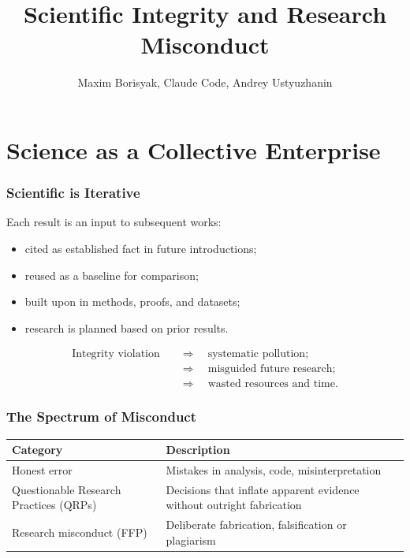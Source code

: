 \documentclass[]{beamer}
\author{Maxim Borisyak, Claude Code, Andrey Ustyuzhanin}
\institute{Constructor University Bremen}
\begin{document}
\title{Scientific Integrity and Research Misconduct}

\begin{frame}[plain]
\titlepage
\end{frame}

\section{Science as a Collective Enterprise}

\begin{frame}[fragile]
\frametitle{Scientific is Iterative}
Each result is an input to subsequent works:
\begin{itemize}
  \item cited as established fact in future introductions;
  \item reused as a baseline for comparison;
  \item built upon in methods, proofs, and datasets;
  \item research is planned based on prior results.
\end{itemize}

\begin{align*}
\text{Integrity violation}\quad &\Longrightarrow \quad \text{systematic pollution};\\
    &\Longrightarrow \quad \text{misguided future research};\\
    &\Longrightarrow \quad \text{wasted resources and time}.
\end{align*}

\end{frame}

\begin{frame}[fragile]
\frametitle{The Spectrum of Misconduct}
{\footnotesize
\begin{tabular}{p{3.5cm} p{6.5cm}}
\toprule
\textbf{Category} & \textbf{Description} \\
\midrule
Honest error & Mistakes in analysis, code, misinterpretation \\
\addlinespace
Questionable Research Practices (QRPs) & Decisions that inflate apparent evidence without outright fabrication \\
\addlinespace
Research misconduct (FFP) & Deliberate fabrication, falsification or plagiarism \\
\bottomrule
\end{tabular}
}

\end{frame}
\end{document}
